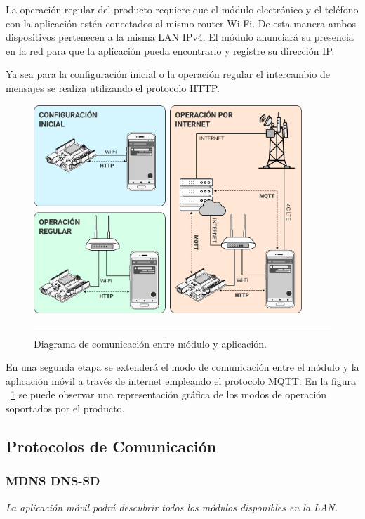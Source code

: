 La operación regular del producto requiere que el módulo electrónico y el teléfono con la aplicación estén conectados al mismo router Wi-Fi. De esta manera ambos dispositivos pertenecen a la misma LAN IPv4. El módulo anunciará su presencia en la red para que la aplicación pueda encontrarlo y registre su dirección IP.

Ya sea para la configuración inicial o la operación regular el intercambio de mensajes se realiza utilizando el protocolo HTTP.

\begin{figure}[htbp]
	\centering
	\includegraphics[width=0.9\textwidth]{Figures/design/conect.png}
	\rule{35em}{1pt}
	\caption[Connection Diagram]{Diagrama de comunicación entre módulo y aplicación.}
	\label{fig:comunic_mod_app}
\end{figure}

En una segunda etapa se extenderá el modo de comunicación entre el módulo y la aplicación móvil a través de internet empleando el protocolo MQTT. En la figura ~\ref{fig:comunic_mod_app} se puede observar una representación gráfica de los modos de operación soportados por el producto.

\subsection{Protocolos de Comunicación}
\subsubsection{MDNS DNS-SD}
\emph{La aplicación móvil podrá descubrir todos los módulos disponibles en la LAN.}

